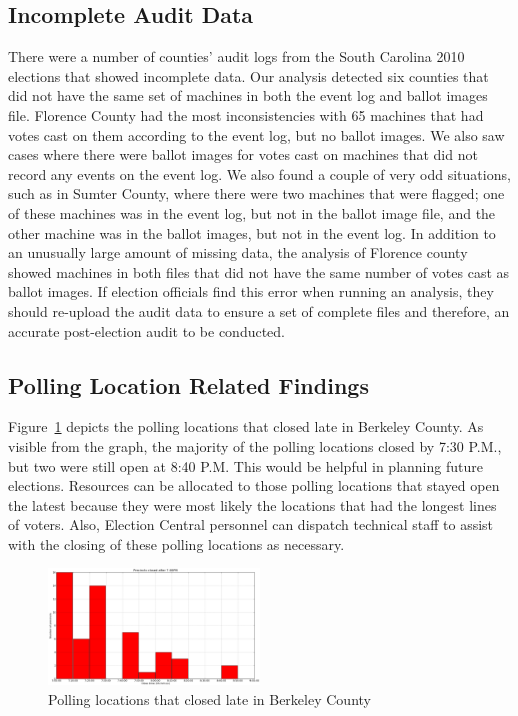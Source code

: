 \subsection{Incomplete Audit Data}
There were a number of counties' audit logs from the South Carolina 2010 elections that showed incomplete data.  Our analysis detected six counties that did not have the same set of machines in both the event log and ballot images file.  Florence County had the most inconsistencies with 65 machines that had votes cast on them according to the event log, but no ballot images.  We also saw cases where there were ballot images for votes cast on machines that did not record any events on the event log.  We also found a couple of very odd situations, such as in Sumter County, where there were two machines that were flagged; one of these machines was in the event log, but not in the ballot image file, and the other machine was in the ballot images, but not in the event log.  In addition to an unusually large amount of missing data, the analysis of Florence county showed machines in both files that did not have the same number of votes cast as ballot images.  If election officials find this error when running an analysis,  they should re-upload the audit data to ensure a set of complete files and therefore, an accurate post-election audit to be conducted.

\subsection{Polling Location Related Findings}

Figure~\ref{fig:late} depicts the polling locations that closed late in Berkeley County.  As visible from the graph, the majority of the polling locations closed by 7:30 P.M., but two were still open at 8:40 P.M.  This would be helpful in planning future elections.  Resources can be allocated to those polling locations that stayed open the latest because they were most likely the locations that had the longest lines of voters.  Also, Election Central personnel can dispatch technical staff to assist with the closing of these polling locations as necessary.   

\begin{figure}[h!]
  \caption{Polling locations that closed late in Berkeley County}
  \label{fig:late}
  \centering
    \includegraphics[width=0.5\textwidth]{berkeley}
\end{figure}


